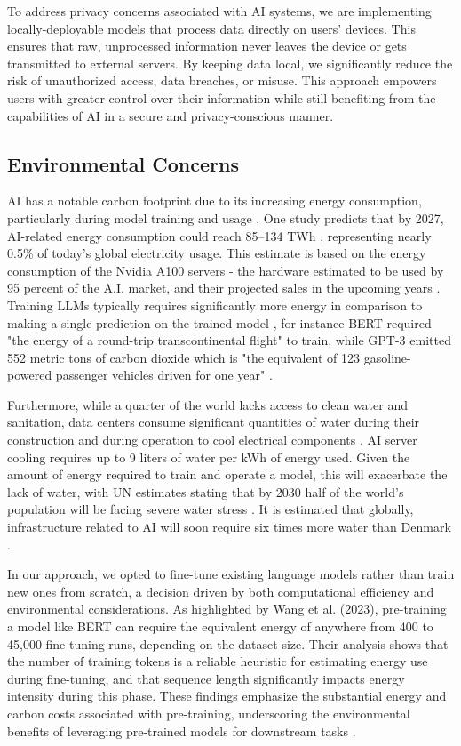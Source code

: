 \documentclass[licencjacka,en]{pracamgr}
\begin{document}
To address privacy concerns associated with AI systems, we are implementing locally-deployable models that process data directly on users' devices. This ensures that raw, unprocessed information never leaves the device or gets transmitted to external servers. By keeping data local, we significantly reduce the risk of unauthorized access, data breaches, or misuse. This approach empowers users with greater control over their information while still benefiting from the capabilities of AI in a secure and privacy-conscious manner.

\subsection{Environmental Concerns}
AI has a notable carbon footprint due to its increasing energy consumption, particularly during model training and usage \cite{forbes_dl_env}. One study predicts that by 2027, AI-related energy consumption could reach 85–134 TWh \cite{this_study}, representing nearly 0.5\% of today's global electricity usage. This estimate is based on the energy consumption of the Nvidia A100 servers - the hardware estimated to be used by 95 percent of the A.I. market, and their projected sales in the upcoming years \cite{nyt_el}. Training LLMs typically requires significantly more energy in comparison to making a single prediction on the trained model \cite{sci_dir_comp}, for instance BERT required "the energy of a round-trip transcontinental flight" to train, while GPT-3 emitted 552 metric tons of carbon dioxide which is "the equivalent of 123 gasoline-powered passenger vehicles driven for one year" \cite{sci_am_co2}.

Furthermore, while a quarter of the world lacks access to clean water and sanitation, data centers consume significant quantities of water during their construction and during operation to cool electrical components \cite{first}. AI server cooling requires up to 9 liters of water per kWh of energy used. Given the amount of energy required to train and operate a model, this will exacerbate the lack of water, with UN estimates stating that by 2030 half of the world’s population will be facing severe water stress \cite{water_scarcity}. It is estimated that globally, infrastructure related to AI will soon require six times more water than Denmark \cite{first}.

In our approach, we opted to fine-tune existing language models rather than train new ones from scratch, a decision driven by both computational efficiency and environmental considerations. As highlighted by Wang et al. (2023), pre-training a model like BERT can require the equivalent energy of anywhere from 400 to 45,000 fine-tuning runs, depending on the dataset size. Their analysis shows that the number of training tokens is a reliable heuristic for estimating energy use during fine-tuning, and that sequence length significantly impacts energy intensity during this phase. These findings emphasize the substantial energy and carbon costs associated with pre-training, underscoring the environmental benefits of leveraging pre-trained models for downstream tasks \cite{finetuning_env_good}.
\end{document}
